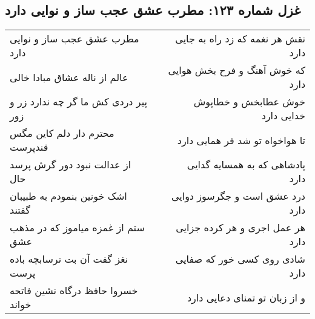\begin{center}
\section*{غزل شماره ۱۲۳: مطرب عشق عجب ساز و نوایی دارد}
\label{sec:sh123}
\begin{longtable}{l p{0.5cm} r}
مطرب عشق عجب ساز و نوایی دارد
&&
نقش هر نغمه که زد راه به جایی دارد
\\
عالم از ناله عشاق مبادا خالی
&&
که خوش آهنگ و فرح بخش هوایی دارد
\\
پیر دردی کش ما گر چه ندارد زر و زور
&&
خوش عطابخش و خطاپوش خدایی دارد
\\
محترم دار دلم کاین مگس قندپرست
&&
تا هواخواه تو شد فر همایی دارد
\\
از عدالت نبود دور گرش پرسد حال
&&
پادشاهی که به همسایه گدایی دارد
\\
اشک خونین بنمودم به طبیبان گفتند
&&
درد عشق است و جگرسوز دوایی دارد
\\
ستم از غمزه میاموز که در مذهب عشق
&&
هر عمل اجری و هر کرده جزایی دارد
\\
نغز گفت آن بت ترسابچه باده پرست
&&
شادی روی کسی خور که صفایی دارد
\\
خسروا حافظ درگاه نشین فاتحه خواند
&&
و از زبان تو تمنای دعایی دارد
\\
\end{longtable}
\end{center}
